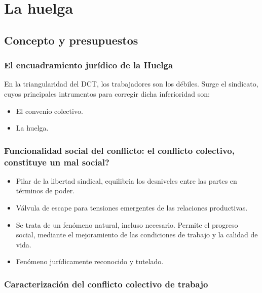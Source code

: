 \documentclass[spanish,12pt,a4paper,titlepage]{report}
\begin{document}
\chapter{La huelga}

\section{Concepto y presupuestos}
\label{sec:Concepto-y-presupuestos}

\subsection{El encuadramiento jurídico de la Huelga}
\label{sec:El-encuadramiento-juridico-de-la-Huelga}

En la triangularidad del DCT, los trabajadores son los débiles. Surge el sindicato, cuyos principales intrumentos para corregir dicha inferioridad son:
\begin{itemize}
\item El convenio colectivo.
\item La huelga.
\end{itemize}

\subsection{Funcionalidad social del conflicto: el conflicto colectivo, constituye un mal social?}
\label{sec:Funcionalidad-social-del-conflicto:-el-conflicto-colectivo-constituye-un-mal-social}

\begin{itemize}
\item Pilar de la libertad sindical, equilibria los desniveles entre las partes en términos de poder.
\item Válvula de escape para tensiones emergentes de las relaciones productivas.
\item Se trata de un fenómeno natural, incluso necesario. Permite el progreso social, mediante el mejoramiento de las condiciones de trabajo y la calidad de vida.
\item Fenómeno jurídicamente reconocido y tutelado.
\end{itemize}

\subsection{Caracterización del conflicto colectivo de trabajo}
\label{sec:Caracterizacion-del-conflicto-colectivo-de-trabajo}
\end{document}
